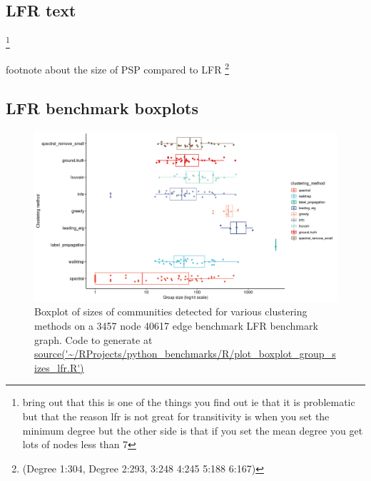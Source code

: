 \subsection{LFR text}
\footnote{bring out that this is one of the things you find out ie that it is problematic but that the reason lfr is not great for transitivity is when you set the minimum degree but the other side is that if you set the mean degree you get lots of nodes less than 7}


footnote about the size of PSP compared to LFR
\footnote{(Degree 1:304, Degree 2:293, 3:248 4:245 5:188 6:167)}

\subsection{LFR benchmark boxplots}


  \begin{figure}
      \centering
      \includegraphics[width=\textwidth]{images/Rplot_draft_plot_boxplot_group_sizes_lfr.png}
      \caption{Boxplot of sizes of communities detected for various clustering methods on a 3457 node 40617 edge benchmark LFR benchmark graph. Code to generate at \url{source('~/RProjects/python_benchmarks/R/plot_boxplot_group_sizes_lfr.R')}}
      \label{fig:boxplot group size lfr clustering methods}
  \end{figure}
 
 
 
